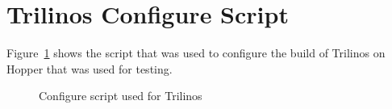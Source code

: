 \documentclass[pdf,12pt]{SANDreport}
\begin{document}
\clearpage
\providecommand*{\phantomsection}{}
\phantomsection
{}



\appendix
\section{Trilinos Configure Script}
Figure~\ref{triConf} shows the script that was used to configure the build of Trilinos on Hopper that was used for testing.
\begin{figure}
\centering
{\footnotesize
{}
}
\caption{Configure script used for Trilinos}
\label{triConf}
\end{figure}
\begin{SANDdistribution}[NM]

\end{SANDdistribution}
\end{document}
